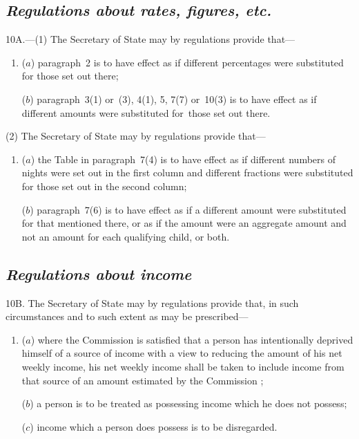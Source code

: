 \documentclass[12pt,a4paper]{article}
\begin{document}
\subsection*{\itshape Regulations about rates, figures, etc.}

10A.---(1) The Secretary of State may by regulations provide that—
\begin{enumerate}\item[]
($a$) paragraph~2 is to have effect as if different percentages were substituted for those set out there;

($b$) paragraph~3(1)  or~(3), 4(1), 5, 7(7)  or~10(3)  is to have effect as if different amounts were substituted for~those set out there.
\end{enumerate}

(2) The Secretary of State may by regulations provide that—
\begin{enumerate}\item[]
($a$) the Table in paragraph~7(4)  is to have effect as if different numbers of nights were set out in the first column and different fractions were substituted for those set out in the second column;

($b$) paragraph~7(6)  is to have effect as if a different amount were substituted for that mentioned there, or as if the amount were an aggregate amount and not an amount for each qualifying child, or both.
\end{enumerate}

\subsection*{\itshape Regulations about income}

10B. The Secretary of State may by regulations provide that, in such circumstances and to such extent as may be prescribed—
\begin{enumerate}\item[]
($a$) where the 
Commission  %
is satisfied that a person has intentionally deprived himself of a source of income with a view to reducing the amount of his net weekly income, his net weekly income shall be taken to include income from that source of an amount estimated by the 
Commission%
;

($b$) a person is to be treated as possessing income which he does not possess;

($c$) income which a person does possess is to be disregarded.
\end{enumerate}
\end{document}
